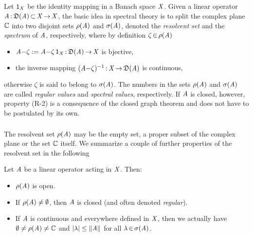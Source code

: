 \documentclass[11pt,twoside]{article}
\begin{document}
\subsection{} %
Let ${\mathsf{1}}_{\mathit{X}}$ be the identity mapping in a Banach space $\mathit{X}$.
Given a linear operator $\mathit{A} {\,:\,} \mathfrak{D}(\mathit{A}) {\,\subset\,} \mathit{X} {\,\to\,} \mathit{X}$,
the basic idea in spectral theory is to split the complex plane ${\mathbb{C}}$
into two disjoint sets $\rho(\mathit{A})$ and $\sigma(\mathit{A})$,
denoted the \textit{resolvent set} and the \textit{spectrum} of $\mathit{A}$,
respectively,
where by definition $\zeta {\,\in\,} \rho(\mathit{A})$ \iff

\begin{itemize}[leftmargin=12mm]
\item[(R-1)]
$\mathit{A} {-} \zeta := \mathit{A} {-} \zeta \, {\mathsf{1}}_{\mathit{X}} {\,:\,} \mathfrak{D}(\mathit{A}) {\,\to\,} \mathit{X}$
is bjective,

\item[(R-2)]
the inverse mapping $(\mathit{A} {-} \zeta)^{-1} {\,:\,} \mathit{X} {\,\to\,} \mathfrak{D}(\mathit{A})$
is continuous,
\end{itemize}

otherwise $\zeta$ is said to belong to $\sigma(\mathit{A})$.
The numbers in the sets $\rho(\mathit{A})$ and $\sigma(\mathit{A})$
are called \textit{regular values} and \textit{spectral values},
respectively.
If $\mathit{A}$ is closed,
however,
property (R-2) is a consequence of the closed graph theorem
and does not have to be postulated by its own.

\subparagraph{} %
The resolvent set $\rho(\mathit{A})$
may be the empty set, a proper subset of the complex plane
or the set ${\mathbb{C}}$ itself.
We summarize a couple of further properties of the resolvent set
in the following

\begin{theorem}
Let $\mathit{A}$ be a linear operator acting in $\mathit{X}$.
Then:
\begin{itemize}[leftmargin=9mm]
\item[(a)]
$\rho(\mathit{A})$ is open.

\item[(b)]
If $\rho(\mathit{A}) \neq \emptyset$, then $\mathit{A}$ is closed
(and often denoted \textit{regular}).

\item[(c)]
If $\mathit{A}$ is continuous and everywhere defined in $\mathit{X}$,
then we actually have $\emptyset \neq \rho(\mathit{A}) \neq {\mathbb{C}}$ and
$\abs{\lambda} \leq \norm{\linA}$ for all $\lambda {\,\in\,} \sigma(\mathit{A})$.
\end{itemize}
\end{theorem}
\end{document}
